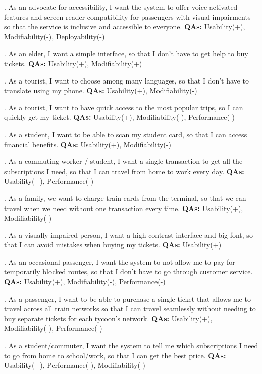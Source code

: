 . As an advocate for accessibility, I want the system to offer voice-activated features and screen reader compatibility for passengers with visual impairments so that the service is inclusive and accessible to everyone. \textbf{QAs:} Usability(+), Modifiability(-), Deployability(-)

. As an elder, I want a simple interface, so that I don't have to get help to buy tickets. \textbf{QAs:} Usability(+), Modifiability(+)

. As a tourist, I want to choose among many languages, so that I don't have to translate using my phone. \textbf{QAs:} Usability(+), Modifiability(-)

. As a tourist, I want to have quick access to the most popular trips, so I can quickly get my ticket. \textbf{QAs:} Usability(+), Modifiability(-), Performance(-)

. As a student, I want to be able to scan my student card, so that I can access financial benefits. \textbf{QAs:} Usability(+), Modifiability(-)

. As a commuting worker / student, I want a single transaction to get all the subscriptions I need, so that I can travel from home to work every day. \textbf{QAs:} Usability(+), Performance(-)

. As a family, we want to charge train cards from the terminal, so that we can travel when we need without one transaction every time. \textbf{QAs:} Usability(+), Modifiability(-)

. As a visually impaired person, I want a high contrast interface and big font, so that I can avoid mistakes when buying my tickets. \textbf{QAs:} Usability(+)

. As an occasional passenger, I want the system to not allow me to pay for temporarily blocked routes, so that I don't have to go through customer service. \textbf{QAs:} Usability(+), Modifiability(-), Performance(-)

. As a passenger, I want to be able to purchase a single ticket that allows me to travel across all train networks so that I can travel seamlessly without needing to buy separate tickets for each tycoon's network. \textbf{QAs:} Usability(+), Modifiability(-), Performance(-)

. As a student/commuter, I want the system to tell me which subscriptions I need to go from home to school/work, so that I can get the best price. \textbf{QAs:} Usability(+), Performance(-), Modifiability(-)

